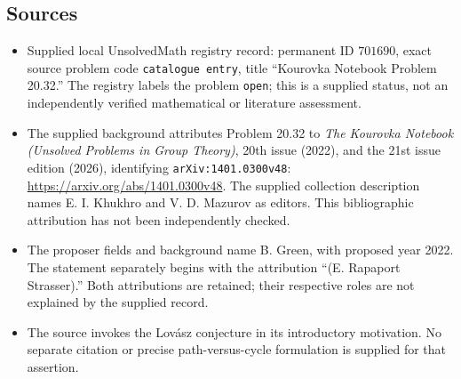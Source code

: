 \documentclass[11pt]{article}
\begin{document}
\subsection{Sources}
\begin{itemize}
\item Supplied local UnsolvedMath registry record: permanent ID \(701690\), exact source problem code \texttt{catalogue entry}, title ``Kourovka Notebook Problem 20.32.'' The registry labels the problem \texttt{open}; this is a supplied status, not an independently verified mathematical or literature assessment.
\item The supplied background attributes Problem 20.32 to \emph{The Kourovka Notebook (Unsolved Problems in Group Theory)}, 20th issue (2022), and the 21st issue edition (2026), identifying \texttt{arXiv:1401.0300v48}: \url{https://arxiv.org/abs/1401.0300v48}. The supplied collection description names E. I. Khukhro and V. D. Mazurov as editors. This bibliographic attribution has not been independently checked.
\item The proposer fields and background name B. Green, with proposed year 2022. The statement separately begins with the attribution ``(E. Rapaport Strasser).'' Both attributions are retained; their respective roles are not explained by the supplied record.
\item The source invokes the Lov\'asz conjecture in its introductory motivation. No separate citation or precise path-versus-cycle formulation is supplied for that assertion.
\end{itemize}
\end{document}
